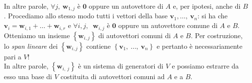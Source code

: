 \begin{demonstration}
\begin{equation*}
\end{equation*}
In altre parole, $\forall j,\ \mathbf{w}_{1,j}$ è $\mathbf{0}$ oppure un autovettore di $A$ e, per ipotesi, anche di $B$. Procediamo allo stesso modo tutti i vettori della base $\mathbf{v}_1, \ldots,\ \mathbf{v}_n$: si ha che $\mathbf{v}_i=\mathbf{w}_{i,1}+\ldots+\mathbf{w}_{i,r}$ e $\forall i, j,\ $ $\mathbf{w}_{i,j}$ è $\mathbf{0}$ oppure un autovettore comune di $A$ e $B$.\\
Otteniamo un insieme $\left\{\mathbf{w}_{i, j}\right\}$ di autovettori comuni di $A$ e $B$. Per costruzione, lo \textit{span lineare} dei $\left\{\mathbf{w}_{i, j}\right\}$ contiene $\left\{\mathbf{v}_1,\ \ldots,\ \mathbf{v}_n\right\}$ e pertanto è necessariamente pari a $V$!\\
In altre parole, $\left\{\mathbf{w}_{i,\ j}\right\}$ è un sistema di generatori di $V$ e possiamo estrarre da esso una base di $V$ costituita di autovettori comuni ad $A$ e a $B$.
\end{demonstration}
